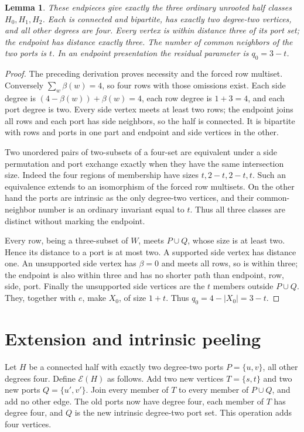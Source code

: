 \documentclass[11pt]{article}
\newtheorem{lemma}[theorem]{Lemma}
\theoremstyle{definition}\newtheorem{definition}[theorem]{Definition}
\newcommand{\E}{\mathcal E}
\begin{document}
\begin{lemma}\label{base}
These endpieces give exactly the three ordinary unrooted half classes
$H_0,H_1,H_2$. Each is connected and bipartite, has exactly two
degree-two vertices, and all other degrees are four. Every vertex
is within distance three of its port set; the endpoint has distance
exactly three. The number of common neighbors of the two ports is
$t$. In an endpoint presentation the residual parameter is
$q_0=3-t$.
\end{lemma}
\begin{proof}
The preceding derivation proves necessity and the forced row multiset.
Conversely $\sum_w\beta(w)=4$, so four rows with those omissions
exist. Each side degree is $(4-\beta(w))+\beta(w)=4$, each row
degree is $1+3=4$, and each port degree is two. Every side vertex
meets at least two rows; the endpoint joins all rows and each port
has side neighbors, so the half is connected. It is bipartite with
rows and ports in one part and endpoint and side vertices in the other.

Two unordered pairs of two-subsets of a four-set are equivalent
under a side permutation and port exchange exactly when they have
the same intersection size. Indeed the four regions of membership
have sizes $t,2-t,2-t,t$. Such an equivalence extends to an
isomorphism of the forced row multisets. On the other hand the
ports are intrinsic as the only degree-two vertices, and their
common-neighbor number is an ordinary invariant equal to $t$.
Thus all three classes are distinct without marking the endpoint.

Every row, being a three-subset of $W$, meets $P\cup Q$, whose
size is at least two. Hence its distance to a port is at most two.
A supported side vertex has distance one. An unsupported side
vertex has $\beta=0$ and meets all rows, so is within three; the
endpoint is also within three and has no shorter path than
endpoint, row, side, port. Finally the unsupported side vertices
are the $t$ members outside $P\cup Q$. They, together with $e$,
make $X_0$, of size $1+t$. Thus $q_0=4-|X_0|=3-t$.
\end{proof}

\section{Extension and intrinsic peeling}

Let $H$ be a connected half with exactly two degree-two ports
$P=\{u,v\}$, all other degrees four. Define $\E(H)$ as follows.
Add two new vertices $T=\{s,t\}$ and two new ports
$Q=\{u',v'\}$. Join every member of $T$ to every member of
$P\cup Q$, and add no other edge. The old ports now have degree
four, each member of $T$ has degree four, and $Q$ is the new
intrinsic degree-two port set. This operation adds four vertices.
\end{document}
